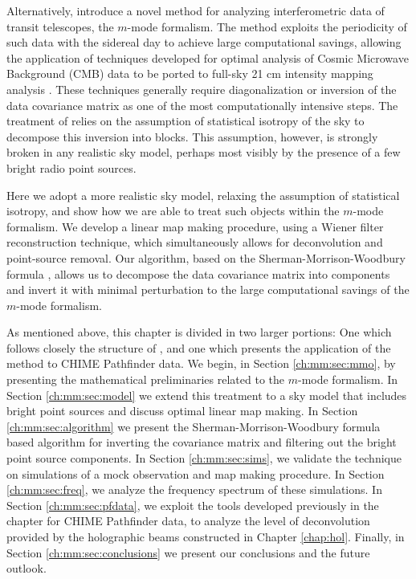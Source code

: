 Alternatively, \cite{mmodes1, mmodes2} introduce a novel method for analyzing interferometric data of transit telescopes, the $m$-mode formalism. The method exploits the periodicity of such data with the sidereal day to achieve large computational savings, allowing the application of techniques developed for optimal analysis of Cosmic Microwave Background (CMB) data \citep{bondjaffeknox, tegmark, myerscbi} to be ported to full-sky 21 cm intensity mapping analysis \citep{liutegmark}. These techniques generally require diagonalization or inversion of the data covariance matrix as one of the most computationally intensive steps. The treatment of \cite{mmodes1, mmodes2} relies on the assumption of statistical isotropy of the sky to decompose this inversion into blocks. This assumption, however, is strongly broken in any realistic sky model, perhaps most visibly by the presence of a few bright radio point sources.

Here we adopt a more realistic sky model, relaxing the assumption of statistical isotropy, and show how we are able to treat such objects within the $m$-mode formalism. We develop a linear map making procedure, using a Wiener filter reconstruction technique, which simultaneously allows for deconvolution and point-source removal. Our algorithm, based on the Sherman-Morrison-Woodbury formula \citep{smf1, smf2, woodbury}, allows us to decompose the data covariance matrix into components and invert it with minimal perturbation to the large computational savings of the $m$-mode formalism.

As mentioned above, this chapter is divided in two larger portions: One which follows closely the structure of \citep{bergeroppermann}, and one which presents the application of the method to CHIME Pathfinder data. We begin, in Section \ref{ch:mm:sec:mmo}, by presenting the mathematical preliminaries related to the $m$-mode formalism. In Section \ref{ch:mm:sec:model} we extend this treatment to a sky model that includes bright point sources and discuss optimal linear map making. In Section \ref{ch:mm:sec:algorithm} we present the Sherman-Morrison-Woodbury formula based algorithm for inverting the covariance matrix and filtering out the bright point source components. In Section \ref{ch:mm:sec:sims}, we validate the technique on simulations of a mock observation and map making procedure. In Section \ref{ch:mm:sec:freq}, we analyze the frequency spectrum of these simulations. In Section \ref{ch:mm:sec:pfdata}, we exploit the tools developed previously in the chapter for CHIME Pathfinder data, to analyze the level of deconvolution provided by the holographic beams constructed in Chapter \ref{chap:hol}. Finally, in Section \ref{ch:mm:sec:conclusions} we present our conclusions and the future outlook.

